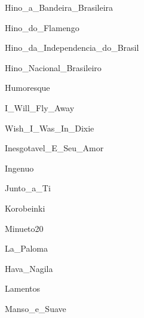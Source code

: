 \documentclass{scrartcl}
\begin{document}

{Hino_a_Bandeira_Brasileira}


{Hino_do_Flamengo}


{Hino_da_Independencia_do_Brasil}


{Hino_Nacional_Brasileiro}


{Humoresque}


{I_Will_Fly_Away}


{Wish_I_Was_In_Dixie}


{Inesgotavel_E_Seu_Amor}


{Ingenuo}


{Junto_a_Ti}


{Korobeinki}


{Minueto20}


{La_Paloma}


{Hava_Nagila}


{Lamentos}


{Manso_e_Suave}
\end{document}
